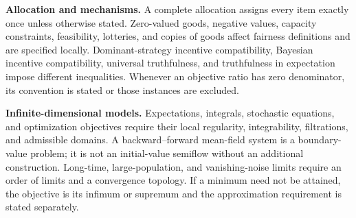 \documentclass[11pt,a4paper]{article}
\begin{document}
\textbf{Allocation and mechanisms.} A complete allocation assigns every item
exactly once unless otherwise stated. Zero-valued goods, negative values,
capacity constraints, feasibility, lotteries, and copies of goods affect
fairness definitions and are specified locally. Dominant-strategy incentive
compatibility, Bayesian incentive compatibility, universal truthfulness,
and truthfulness in expectation impose different inequalities. Whenever
an objective ratio has zero denominator, its convention is stated or those
instances are excluded.

\textbf{Infinite-dimensional models.} Expectations, integrals, stochastic
equations, and optimization objectives require their local regularity,
integrability, filtrations, and admissible domains. A backward--forward
mean-field system is a boundary-value problem; it is not an initial-value
semiflow without an additional construction. Long-time, large-population,
and vanishing-noise limits require an order of limits and a convergence
topology. If a minimum need not be attained, the objective is its infimum
or supremum and the approximation requirement is stated separately.
\end{document}
